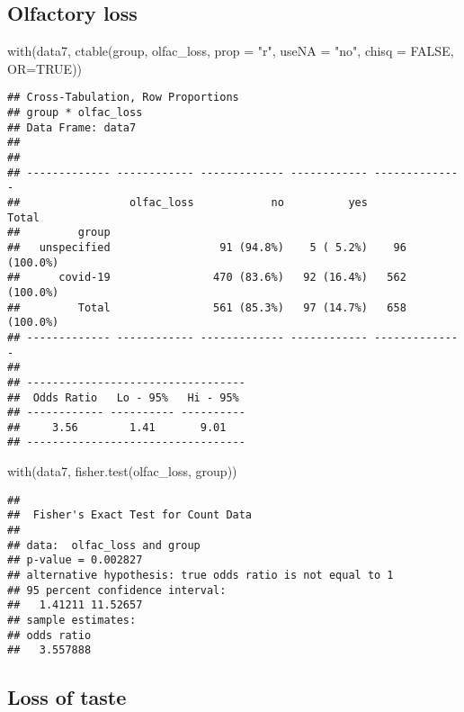 \documentclass[
]{article}
\newenvironment{Shaded}{\begin{snugshade}}{\end{snugshade}}
\newcommand{\AttributeTok}[1]{\textcolor[rgb]{0.77,0.63,0.00}{#1}}
\newcommand{\ConstantTok}[1]{\textcolor[rgb]{0.00,0.00,0.00}{#1}}
\newcommand{\FunctionTok}[1]{\textcolor[rgb]{0.00,0.00,0.00}{#1}}
\newcommand{\NormalTok}[1]{#1}
\newcommand{\StringTok}[1]{\textcolor[rgb]{0.31,0.60,0.02}{#1}}
\begin{document}
\hypertarget{olfactory-loss}{%
\subsection{Olfactory loss}\label{olfactory-loss}}

\begin{Shaded}
\begin{Highlighting}[]
\FunctionTok{with}\NormalTok{(data7, }\FunctionTok{ctable}\NormalTok{(group, olfac\_loss, }\AttributeTok{prop =} \StringTok{"r"}\NormalTok{, }\AttributeTok{useNA =} \StringTok{"no"}\NormalTok{, }\AttributeTok{chisq =} \ConstantTok{FALSE}\NormalTok{, }\AttributeTok{OR=}\ConstantTok{TRUE}\NormalTok{))}
\end{Highlighting}
\end{Shaded}

\begin{verbatim}
## Cross-Tabulation, Row Proportions  
## group * olfac_loss  
## Data Frame: data7  
## 
## 
## ------------- ------------ ------------- ------------ --------------
##                 olfac_loss            no          yes          Total
##         group                                                       
##   unspecified                 91 (94.8%)    5 ( 5.2%)    96 (100.0%)
##      covid-19                470 (83.6%)   92 (16.4%)   562 (100.0%)
##         Total                561 (85.3%)   97 (14.7%)   658 (100.0%)
## ------------- ------------ ------------- ------------ --------------
## 
## ----------------------------------
##  Odds Ratio   Lo - 95%   Hi - 95% 
## ------------ ---------- ----------
##     3.56        1.41       9.01   
## ----------------------------------
\end{verbatim}

\begin{Shaded}
\begin{Highlighting}[]
\FunctionTok{with}\NormalTok{(data7, }\FunctionTok{fisher.test}\NormalTok{(olfac\_loss, group))}
\end{Highlighting}
\end{Shaded}

\begin{verbatim}
## 
##  Fisher's Exact Test for Count Data
## 
## data:  olfac_loss and group
## p-value = 0.002827
## alternative hypothesis: true odds ratio is not equal to 1
## 95 percent confidence interval:
##   1.41211 11.52657
## sample estimates:
## odds ratio 
##   3.557888
\end{verbatim}

\hypertarget{loss-of-taste}{%
\subsection{Loss of taste}\label{loss-of-taste}}
\end{document}
